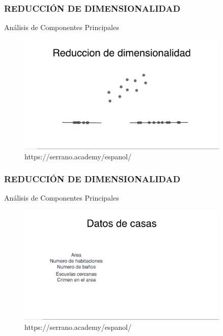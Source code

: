 \documentclass{beamer}
\begin{document}
\begin{frame}
	\frametitle{REDUCCIÓN DE DIMENSIONALIDAD}
	\begin{block}{Análisis de Componentes Principales}	
		\begin{figure}
			\includegraphics[width=0.9\textwidth]{PCA/IMG_3534.jpg}
			\caption{https://serrano.academy/espanol/}
		\end{figure}
	\end{block}
\end{frame}


\begin{frame}
	\frametitle{REDUCCIÓN DE DIMENSIONALIDAD}
	\begin{block}{Análisis de Componentes Principales}	
		\begin{figure}
			\includegraphics[width=0.9\textwidth]{PCA/IMG_3535.jpg}
			\caption{https://serrano.academy/espanol/}
		\end{figure}
	\end{block}
\end{frame}
\end{document}
